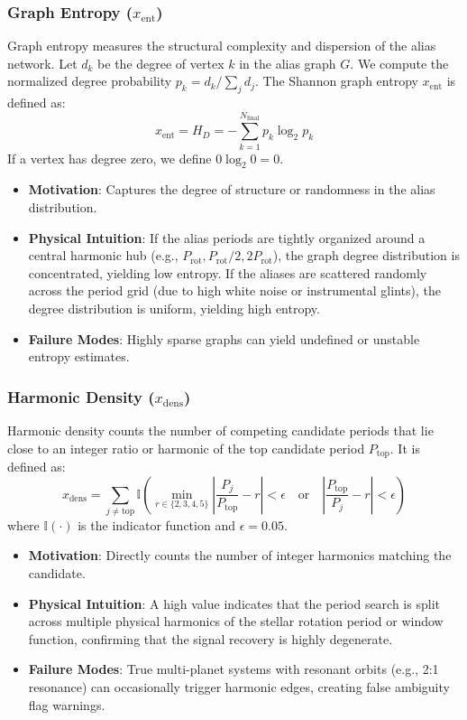 \subsubsection{Graph Entropy ($x_{\text{ent}}$)}
Graph entropy measures the structural complexity and dispersion of the alias network. Let $d_k$ be the degree of vertex $k$ in the alias graph $G$. We compute the normalized degree probability $p_k = d_k / \sum_{j} d_j$. The Shannon graph entropy $x_{\text{ent}}$ is defined as:
\begin{equation}
x_{\text{ent}} = H_D = -\sum_{k=1}^{N_{\text{final}}} p_k \log_2 p_k
\label{eq:entropy}
\end{equation}
If a vertex has degree zero, we define $0 \log_2 0 = 0$.
\begin{itemize}
\item \textbf{Motivation}: Captures the degree of structure or randomness in the alias distribution.
\item \textbf{Physical Intuition}: If the alias periods are tightly organized around a central harmonic hub (e.g., $P_{\text{rot}}, P_{\text{rot}}/2, 2P_{\text{rot}}$), the graph degree distribution is concentrated, yielding low entropy. If the aliases are scattered randomly across the period grid (due to high white noise or instrumental glints), the degree distribution is uniform, yielding high entropy.
\item \textbf{Failure Modes}: Highly sparse graphs can yield undefined or unstable entropy estimates.
\end{itemize}

\subsubsection{Harmonic Density ($x_{\text{dens}}$)}
Harmonic density counts the number of competing candidate periods that lie close to an integer ratio or harmonic of the top candidate period $P_{\text{top}}$. It is defined as:
\begin{equation}
x_{\text{dens}} = \sum_{j \ne \text{top}} \mathbb{I}\left(\min_{r \in \{2, 3, 4, 5\}} \left| \frac{P_j}{P_{\text{top}}} - r \right| < \epsilon \quad \text{or} \quad \left| \frac{P_{\text{top}}}{P_j} - r \right| < \epsilon \right)
\label{eq:hden}
\end{equation}
where $\mathbb{I}(\cdot)$ is the indicator function and $\epsilon = 0.05$.
\begin{itemize}
\item \textbf{Motivation}: Directly counts the number of integer harmonics matching the candidate.
\item \textbf{Physical Intuition}: A high value indicates that the period search is split across multiple physical harmonics of the stellar rotation period or window function, confirming that the signal recovery is highly degenerate.
\item \textbf{Failure Modes}: True multi-planet systems with resonant orbits (e.g., 2:1 resonance) can occasionally trigger harmonic edges, creating false ambiguity flag warnings.
\end{itemize}

